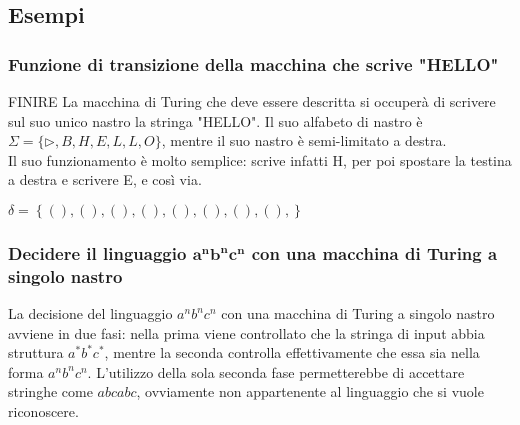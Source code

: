 \subsection*{Esempi}

\subsubsection{Funzione di transizione della macchina che scrive "HELLO"}
FINIRE
La macchina di Turing che deve essere descritta si occuperà di scrivere sul suo unico nastro la stringa "HELLO".
Il suo alfabeto di nastro è $\Sigma = \{ \triangleright , B, H, E, L, L, O \}$, mentre il suo nastro è semi-limitato a destra.\\
Il suo funzionamento è molto semplice: scrive infatti H, per poi spostare la testina a destra e scrivere E, e così via.

$\delta = \left\{ 
(),
(),
(),
(),
(),
(),
(),
(),
\right\}$

\subsubsection{Decidere il linguaggio $\mathbf{a^nb^nc^n}$ con una macchina di Turing a singolo nastro}
La decisione del linguaggio $a^nb^nc^n$ con una macchina di Turing a singolo nastro avviene in due fasi: nella prima viene controllato che la stringa di input abbia struttura $a^*b^*c^*$, mentre la seconda controlla effettivamente che essa sia nella forma $a^nb^nc^n$.
L'utilizzo della sola seconda fase permetterebbe di accettare stringhe come $abcabc$, ovviamente non appartenente al linguaggio che si vuole riconoscere.

